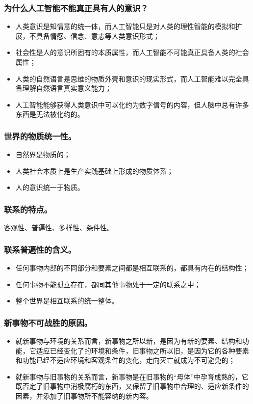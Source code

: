 \documentclass{article}
\begin{document}
\subsubsection{为什么人工智能不能真正具有人的意识？}
\begin{itemize}
    \item 人类意识是知情意的统一体，而人工智能只是对人类的理性智能的模拟和扩展，不具备情感、信念、意志等人类意识形式；
    \item 社会性是人的意识所固有的本质属性，而人工智能不可能真正具备人类的社会属性；
    \item 人类的自然语言是思维的物质外壳和意识的现实形式，而人工智能难以完全具备理解自然语言真实意义能力；
    \item 人工智能能够获得人类意识中可以化约为数字信号的内容，但人脑中总有许多东西是无法被化约的。
\end{itemize}

\subsubsection{世界的物质统一性。}
\begin{itemize}
    \item 自然界是物质的；
    \item 人类社会本质上是生产实践基础上形成的物质体系；
    \item 人的意识统一于物质。
\end{itemize}

\subsubsection{联系的特点。}
客观性、普遍性、多样性、条件性。

\subsubsection{联系普遍性的含义。}
\begin{itemize}
    \item 任何事物内部的不同部分和要素之间都是相互联系的，都具有内在的结构性；
    \item 任何事物不能孤立存在，都同其他事物处于一定的联系之中；
    \item 整个世界是相互联系的统一整体。
\end{itemize}

\subsubsection{新事物不可战胜的原因。}
\begin{itemize}
    \item 就新事物与环境的关系而言，新事物之所以新，是因为有新的要素、结构和功能，它适应已经变化了的环境和条件，旧事物之所以旧，是因为它的各种要素和功能已经不适应环境和客观条件的变化，走向灭亡就成为不可避免的；
    \item 就新事物与旧事物的关系而言，新事物是在旧事物的“母体”中孕育成熟的，它既否定了旧事物中消极腐朽的东西，又保留了旧事物中合理的、适应新条件的因素，并添加了旧事物所不能容纳的新内容。
\end{itemize}
\end{document}
